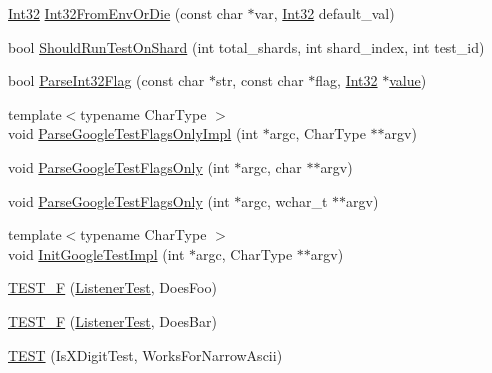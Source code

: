 \begin{DoxyCompactItemize}
\mbox{\hyperlink{namespacetesting_1_1internal_af89e21e4043b5cf0c120af487b24fa06}{Int32}} \mbox{\hyperlink{namespacetesting_1_1internal_a7e70cddd54da21e2c2608613d51288e2}{Int32\+From\+Env\+Or\+Die}} (const char $\ast$var, \mbox{\hyperlink{namespacetesting_1_1internal_af89e21e4043b5cf0c120af487b24fa06}{Int32}} default\+\_\+val)
\item 
bool \mbox{\hyperlink{namespacetesting_1_1internal_a437bd89f5bc532778d7467600e210395}{Should\+Run\+Test\+On\+Shard}} (int total\+\_\+shards, int shard\+\_\+index, int test\+\_\+id)
\item 
bool \mbox{\hyperlink{namespacetesting_1_1internal_ae3449e173767750b613114ceac6d916a}{Parse\+Int32\+Flag}} (const char $\ast$str, const char $\ast$flag, \mbox{\hyperlink{namespacetesting_1_1internal_af89e21e4043b5cf0c120af487b24fa06}{Int32}} $\ast$\mbox{\hyperlink{_obj__test_2lib_2googletest-master_2googlemock_2test_2gmock-matchers__test_8cc_a337b8a670efc0b086ad3af163f3121b6}{value}})
\item 
{\footnotesize template$<$typename Char\+Type $>$ }\\void \mbox{\hyperlink{namespacetesting_1_1internal_ae4c46ce8c3d016848fff52cc5133f2ac}{Parse\+Google\+Test\+Flags\+Only\+Impl}} (int $\ast$argc, Char\+Type $\ast$$\ast$argv)
\item 
void \mbox{\hyperlink{namespacetesting_1_1internal_a472880afbcc592a41e3d623e2dec8412}{Parse\+Google\+Test\+Flags\+Only}} (int $\ast$argc, char $\ast$$\ast$argv)
\item 
void \mbox{\hyperlink{namespacetesting_1_1internal_aa3c81a67914856448d0778990d9d9cab}{Parse\+Google\+Test\+Flags\+Only}} (int $\ast$argc, wchar\+\_\+t $\ast$$\ast$argv)
\item 
{\footnotesize template$<$typename Char\+Type $>$ }\\void \mbox{\hyperlink{namespacetesting_1_1internal_ac3c6fa93391768aa91c6238b31aaeeb5}{Init\+Google\+Test\+Impl}} (int $\ast$argc, Char\+Type $\ast$$\ast$argv)
\item 
\mbox{\hyperlink{namespacetesting_1_1internal_a7e113e9c70d45d89fe1703e58ff083b9}{T\+E\+S\+T\+\_\+F}} (\mbox{\hyperlink{classtesting_1_1internal_1_1_listener_test}{Listener\+Test}}, Does\+Foo)
\item 
\mbox{\hyperlink{namespacetesting_1_1internal_a02cef32090020d164460dd3d9f8e2852}{T\+E\+S\+T\+\_\+F}} (\mbox{\hyperlink{classtesting_1_1internal_1_1_listener_test}{Listener\+Test}}, Does\+Bar)
\item 
\mbox{\hyperlink{namespacetesting_1_1internal_a0c1e055c001e4dbb874f00a46c25bb00}{T\+E\+ST}} (Is\+X\+Digit\+Test, Works\+For\+Narrow\+Ascii)

\end{DoxyCompactItemize}
